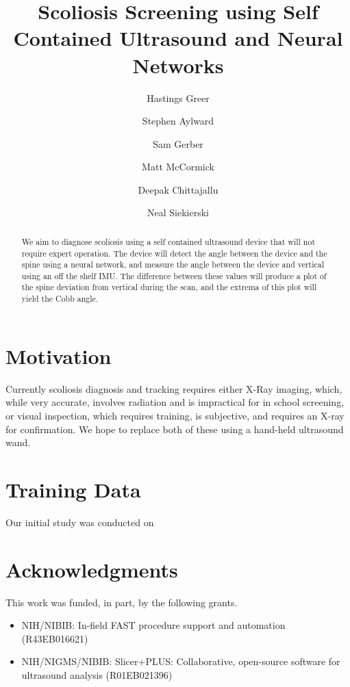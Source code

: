 \documentclass{llncs}
\begin{document}
%
\frontmatter
%
\pagestyle{headings}
\title{Scoliosis Screening using Self Contained Ultrasound and Neural Networks}
\author{Hastings Greer \and Stephen Aylward \and Sam Gerber \and Matt McCormick \and Deepak Chittajallu \and Neal Siekierski }
%
\mainmatter
\maketitle

\begin{abstract}
We aim to diagnose scoliosis using a self contained ultrasound device that will not require expert operation. The device will detect the angle between the device and the spine using a neural network, and measure the angle between the device and vertical using an off the shelf IMU. The difference between these values will produce a plot of the spine deviation from vertical during the scan, and the extrema of this plot will yield the Cobb angle.
\end{abstract}


\section{Motivation}
Currently scoliosis diagnosis and tracking requires either X-Ray imaging, which, while very accurate, involves radiation and is impractical for in school screening, or visual inspection, which requires training, is subjective, and requires an X-ray for confirmation. We hope to replace both of these using a hand-held ultrasound wand.


\section{Training Data}
Our initial study was conducted on 




\section*{Acknowledgments}
This work was funded, in part, by the following grants.
\begin{itemize}
	\item NIH/NIBIB: In-field FAST procedure support and automation (R43EB016621) 
	\item NIH/NIGMS/NIBIB: Slicer+PLUS: Collaborative, open-source software for ultrasound analysis (R01EB021396)
\end{itemize}

%
%



\end{document}
